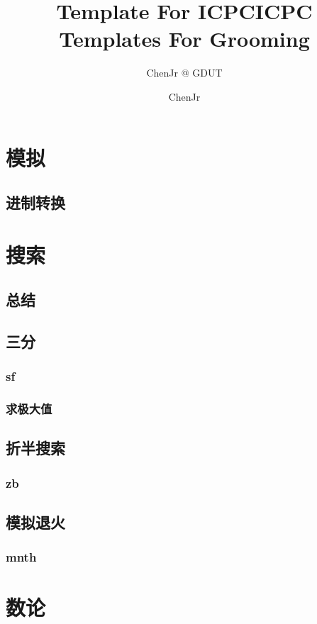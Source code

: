 \documentclass[10pt,a4paper]{article}
\title{Template For ICPC}
\author{ChenJr @ GDUT}
\begin{document}
\title{ICPC Templates For Grooming}
\author {ChenJr}
\maketitle
\tableofcontents
\newpage
\section{模拟}
\subsection{进制转换}

\section{搜索}
\subsection{总结}

\subsection{三分}
\subsubsection{sf}

\subsubsection{求极大值}

\subsection{折半搜索}
\subsubsection{zb}

\subsection{模拟退火}
\subsubsection{mnth}

\section{数论}
\end{document}
